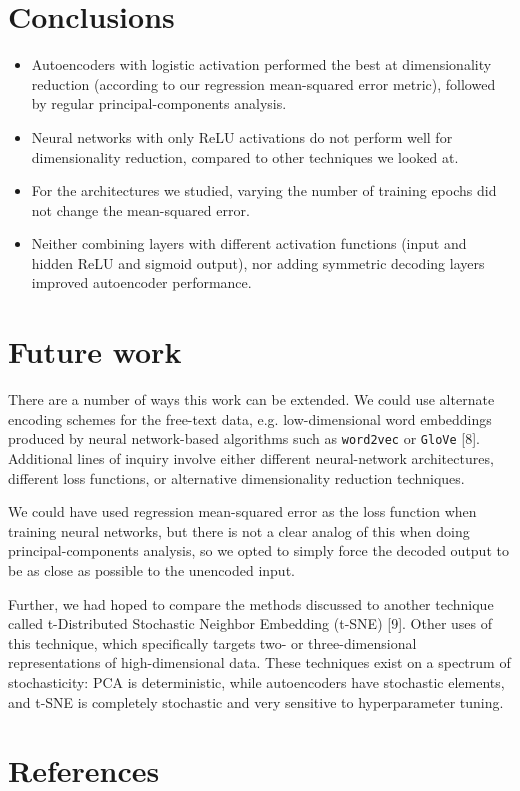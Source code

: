\documentclass{article}
\begin{document}
\section{Conclusions}
\begin{itemize}
\item Autoencoders with logistic activation performed the best at dimensionality reduction (according to our regression mean-squared error metric), followed by regular principal-components analysis.
\item Neural networks with only ReLU activations do not perform well for dimensionality reduction, compared to other techniques we looked at.
\item For the architectures we studied, varying the number of training epochs did not change the mean-squared error. 
\item Neither combining layers with different activation functions (input and hidden ReLU and sigmoid output), nor adding symmetric decoding layers improved autoencoder performance.
\end{itemize}
\section{Future work}

There are a number of ways this work can be extended. We could use alternate encoding schemes for the free-text data, e.g. low-dimensional word embeddings produced by neural network-based algorithms such as \verb+word2vec+ or \verb+GloVe+ [8]. Additional lines of inquiry involve either different neural-network architectures, different loss functions, or alternative dimensionality reduction techniques.

We could have used regression mean-squared error as the loss function when training neural networks, but there is not a clear analog of this when doing principal-components analysis, so we opted to simply force the decoded output to be as close as possible to the unencoded input.

Further, we had hoped to compare the methods discussed to another technique called t-Distributed Stochastic Neighbor Embedding (t-SNE) [9]. Other uses of this technique, which specifically targets two- or three-dimensional representations of high-dimensional data. These techniques exist on a spectrum of stochasticity: PCA is deterministic, while autoencoders have stochastic elements, and t-SNE is completely stochastic and very sensitive to hyperparameter tuning.

\section*{References}
\small
\end{document}
